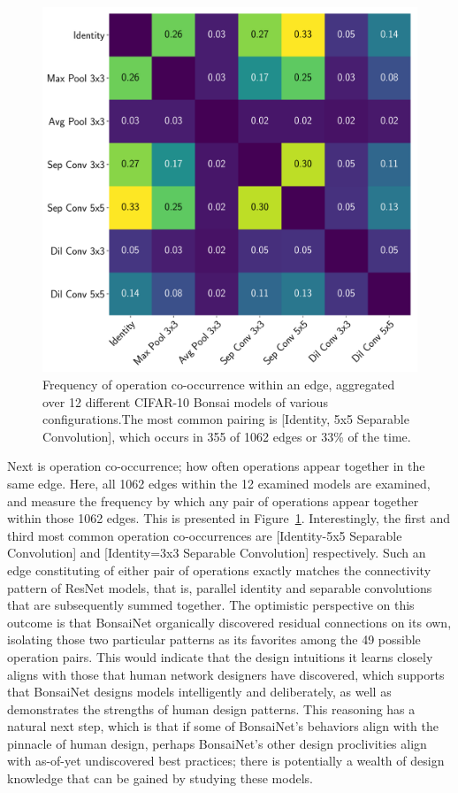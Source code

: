 \begin{figure}[ht]
	\centering
	\includegraphics[width=.7\textwidth]{op_cooccurence}
	\caption[Frequency of operation co-occurrence within an edge]{Frequency of operation co-occurrence within an edge, aggregated over 12 different
	CIFAR-10 Bonsai models of various configurations.The most common pairing is
		[Identity, 5x5 Separable Convolution], which occurs in 355 of 1062 edges or 33\% of the time.}
	\label{fig:op_coocurrence}
\end{figure}

Next is operation co-occurrence; how often operations appear together in the same edge. Here,
all 1062 edges within the 12 examined models are examined, and measure the frequency by which any pair of operations
appear together within those 1062 edges. This is presented in Figure~\ref{fig:op_coocurrence}. Interestingly, the first
and third most common operation co-occurrences are [Identity-5x5 Separable Convolution] and
[Identity=3x3 Separable Convolution] respectively. Such an edge constituting of either pair of operations
exactly matches the connectivity pattern of ResNet models, that is, parallel identity and separable convolutions that
are subsequently summed together. The optimistic perspective on this outcome is that BonsaiNet organically discovered
residual connections on its own, isolating those two particular patterns as its favorites among the 49 possible
operation pairs. This would indicate that the design intuitions it learns closely aligns with those that human network designers have
discovered, which supports that BonsaiNet designs models intelligently and deliberately, as well as demonstrates the strengths
of human design patterns. This reasoning has a natural next step, which is that if some of BonsaiNet's behaviors align
with the pinnacle of human design, perhaps BonsaiNet's other design proclivities align with as-of-yet undiscovered
best practices; there is potentially a wealth of design knowledge that can be gained by studying these models.

